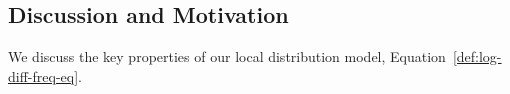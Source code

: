 \documentclass[runningheads,a4paper]{llncs}
\renewcommand{\Qconj}{\Appendterm{\FG{\TT} = \TV} {\QC}} %
\begin{document}

\subsection{Discussion and Motivation} 

We discuss the key properties of our local distribution model, Equation~\eqref{def:log-diff-freq-eq}. 
\end{document}
